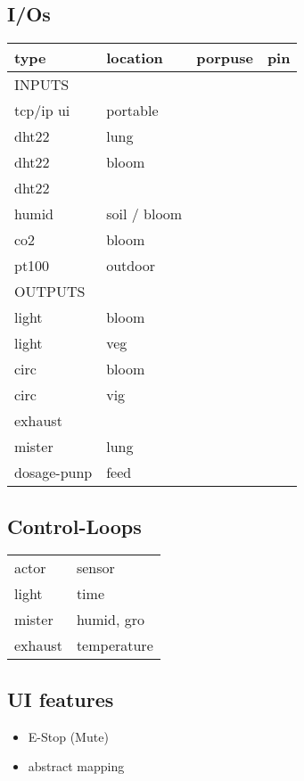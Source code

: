 \documentclass[11pt]{article}
\begin{document}
\subsection{I/Os}
\label{sec:orge2a5d2e}
\begin{center}
\begin{tabular}{llll}
type & location & porpuse & pin\\
\hline
INPUTS &  &  & \\
tcp/ip ui & portable &  & \\
dht22 & lung &  & \\
dht22 & bloom &  & \\
dht22 &  &  & \\
humid & soil / bloom &  & \\
co2 & bloom &  & \\
pt100 & outdoor &  & \\
\hline
OUTPUTS &  &  & \\
light & bloom &  & \\
light & veg &  & \\
circ & bloom &  & \\
circ & vig &  & \\
exhaust &  &  & \\
mister & lung &  & \\
dosage-punp & feed &  & \\
\end{tabular}
\end{center}

\subsection{Control-Loops}
\label{sec:org176c75d}
\begin{center}
\begin{tabular}{ll}
actor & sensor\\
light & time\\
mister & humid, gro\\
exhaust & temperature\\
\end{tabular}
\end{center}

\subsection{UI features}
\label{sec:org1fc4abb}
\begin{itemize}
\item E-Stop (Mute)
\item abstract mapping
\end{itemize}
\end{document}
